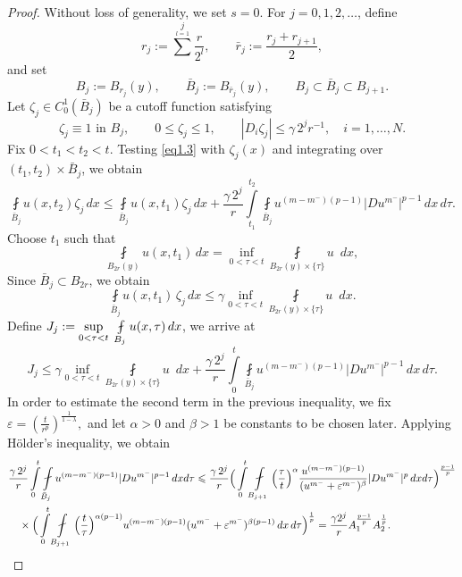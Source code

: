 \documentclass[10pt,a4paper]{amsart}
\begin{document}
\begin{proof}
Without loss of generality, we set $s=0$.
For $j=0,1,2,\dots$, define
$$
r_j:= \sum\limits^{j}\limits_{l=1} \frac{r}{2^{l}},
\qquad
\bar{r}_j := \frac{r_j+ r_{j+1}}{2},
$$
and set
$$
B_j:=B_{r_j}(y),
\qquad
\bar B_j:=B_{\bar{r}_j}(y),\qquad B_j\subset\bar B_j\subset B_{j+1}.
$$
Let $\zeta_j\in C_0^1(\bar B_j)$ be a cutoff function satisfying
$$
\zeta_j\equiv1 \text{ in } B_j,
\qquad
0\leqslant\zeta_j\leqslant 1,
\qquad
|D_i\zeta_j|\leqslant \gamma\,2^{j}r^{-1},
\quad i=1,\dots,N.
$$
Fix $0<t_1<t_2<t$.
Testing \eqref{eq1.3} with $\zeta_j(x)$ and integrating over
$(t_1,t_2)\times\bar B_j$, we obtain
\begin{equation}\label{pre-recurs_ineq}
\fint\limits_{\bar B_j}u(x,t_2)\zeta_j\,dx
\leqslant
\fint\limits_{\bar B_j}u(x,t_1)\zeta_j\,dx
+
\frac{\gamma\,2^j}{r}
\int\limits_{t_1}^{t_2}\fint\limits_{\bar B_j}
u^{(m-m^-)(p-1)}
|D u^{m^-}|^{p-1}\,dx\,d\tau .
\end{equation}
Choose $t_1$ such that
$$
\fint\limits_{B_{2r}(y)} u(x, t_{1})\,dx= \inf\limits_{0<\tau<t} \fint\limits_{B_{2r}(y)\times\{\tau\}} u\,\,\,dx,
$$
Since $\bar B_j\subset B_{2 r}$, we obtain
$$
\fint\limits_{\bar B_j}u(x,t_1)\,\zeta_j\,dx
\leqslant \gamma
\inf\limits_{0<\tau<t} \fint\limits_{B_{2r}(y)\times\{\tau\}} u\,\,\,dx.
$$
Define $J_j:=\sup\limits\limits_{0<\tau<t}\,\,\fint\limits_{B_j}u(x,\tau)\,dx$, we arrive at
\begin{equation}\label{recurs_1}
J_j
\leqslant \gamma
\inf\limits_{0<\tau<t}\fint\limits_{B_{2r}(y)\times\{\tau\}}u\,\,\,dx
+
\frac{\gamma\,2^j}{r}
\int\limits_0^t\fint\limits_{\bar B_j}
u^{(m-m^-)(p-1)}
|D u^{m^-}|^{p-1}\,dx\,d\tau .
\end{equation}
In order to estimate the second term in the previous inequality, we fix  $\varepsilon =  \left(\frac{t}{r^{p}}\right)^{\frac{1}{1-\lambda}},$
and let $\alpha>0$ and $\beta>1$ be constants to be chosen later.  
Applying H\"older's inequality, we obtain
\begin{align}\label{eq5.4}
&\frac{\gamma\,2^j}{r}\int\limits_0^{t}\fint\limits_{\bar B_j}u^{(m-m^-)(p-1)}|D u^{m^-}|^{p-1}\,dx d\tau
\leqslant  \frac{\gamma\,2^j}{r} \Big(\int\limits_0^{t}\fint\limits_{ B_{j+1}}\Big(\frac{\tau}{t}\Big)^{\alpha}\frac{u^{(m-m^-)(p-1)}}{(u^{m^{-}}+\varepsilon^{m^{-}})^{\beta}}|D u^{m^-}|^{p}\,dx d\tau\Big)^{\frac{p-1}{p}}\notag\\
&\quad\times\Big(\int\limits_0^{t}\fint\limits_{B_{j+1}}
\Big(\frac{t}{\tau}\Big)^{\alpha(p-1)} u^{(m-m^{-})(p-1)}(u^{m^{-}}+\varepsilon^{m^{-}})^{\beta(p-1)}\,dx\,d\tau\Big)^{\frac{1}{p}}= \frac{\gamma 2^j}{r}  A_1^{\frac{p-1}{p}} A_2^{\frac{1}{p}}.

\end{align}
\end{proof}
\end{document}
